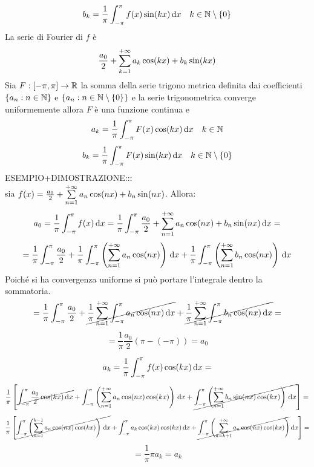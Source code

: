 \[b_k=\frac{1}{\pi}\int_{-\pi}^{\pi}f(x)\sin(kx)\,\mathrm{d}{x}\quad k\in\mathbb{N}\setminus{\left\{0\right\}}\]
La serie di Fourier di $f$ è
\[\frac{a_0}{2}+\sum\limits_{k=1}^{+\infty}a_{k}\cos(kx)+b_{k}\sin(kx)\]
\proposition
Sia $F: \left[-\pi,\pi\right] \to \mathbb{R}$ la somma della serie trigono metrica definita dai coefficienti $\left\{a_n:n\in\mathbb{N}\right\}$ e $\left\{a_n:n\in\mathbb{N}\setminus\left\{0\right\}\right\}$ e la serie trigonometrica converge uniformemente allora $F$ è una funzione continua e
\[a_k=\frac{1}{\pi}\int_{-\pi}^{\pi}F(x)\cos(kx)\,\mathrm{d}{x}\quad k\in\mathbb{N}\]
\[b_k=\frac{1}{\pi}\int_{-\pi}^{\pi}F(x)\sin(kx)\,\mathrm{d}{x}\quad k\in\mathbb{N}\setminus{\left\{0\right\}}\]
ESEMPIO+DIMOSTRAZIONE:::\\
sia $f(x)=\frac{a_0}{2}+\sum\limits_{n=1}^{+\infty}a_{n}\cos(nx)+b_{n}\sin(nx)$. Allora:\\
\[a_0=\frac{1}{\pi}\int_{-\pi}^{\pi}f(x)\,\mathrm{d}{x}=\frac{1}{\pi}\int_{-\pi}^{\pi}\frac{a_0}{2}+\sum\limits_{n=1}^{+\infty}a_{n}\cos(nx)+b_{n}\sin(nx)\,\mathrm{d}{x}=\]
\[
= \frac{1}{\pi}\int_{-\pi}^{\pi}\frac{a_0}{2} +
\frac{1}{\pi}\int_{-\pi}^{\pi}\left(\sum\limits_{n=1}^{+\infty} a_n \cos(nx)\right)\,\mathrm{d}{x} +
\frac{1}{\pi}\int_{-\pi}^{\pi}\left(\sum\limits_{n=1}^{+\infty} b_n \cos(nx)\right)\,\mathrm{d}{x}
\]
Poiché si ha convergenza uniforme si può portare l'integrale dentro la sommatoria.
\[
= \frac{1}{\pi}\int_{-\pi}^{\pi}\frac{a_0}{2} +
\cancel{\frac{1}{\pi}\sum\limits_{n=1}^{+\infty}\int_{-\pi}^{\pi} a_n \cos(nx)\,\mathrm{d}{x}} +
\cancel{\frac{1}{\pi}\sum\limits_{n=1}^{+\infty}\int_{-\pi}^{\pi} b_n \cos(nx)\,\mathrm{d}{x}}=
\]
\[=\frac{1}{\pi}\frac{a_0}{2}\left(\pi-(-\pi)\right)=a_0\]


\[a_k=\frac{1}{\pi}\int_{-\pi}^{\pi}f(x)\cos(kx)\,\mathrm{d}{x}=\]
\[\frac{1}{\pi}\left[
\cancel{\int_{-\pi}^{\pi}\frac{a_0}{2}\cos(kx)\,\mathrm{d}{x}}+
\int_{-\pi}^{\pi}\left(\sum\limits_{n=1}^{+\infty}a_n\cos(nx)\cos(kx)\right)\,\mathrm{d}{x}+
\cancel{\int_{-\pi}^{\pi}\left(\sum\limits_{n=1}^{+\infty}b_n\sin(nx)\cos(kx)\right)\,\mathrm{d}{x}}
\right]=\]
\[\frac{1}{\pi}\left[
\cancel{\int_{-\pi}^{\pi}\left(\sum\limits_{n=1}^{k-1} a_n\cos(nx)\cos(kx)\right)\,\mathrm{d}{x}}+
\int_{-\pi}^{\pi}a_k\cos(kx)\cos(kx)\,\mathrm{d}{x}+
\cancel{\int_{-\pi}^{\pi}\left(\sum\limits_{n=k+1}^{+\infty}a_n\cos(nx)\cos(kx)\right)}\,\mathrm{d}{x}
\right]=\]
\[=\frac{1}{\pi}\pi a_k=a_k\]

